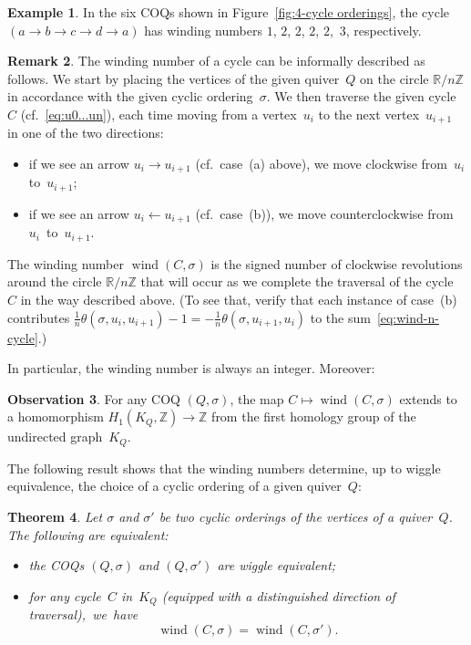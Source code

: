\documentclass[11pt, letterpaper]{amsart}
\newtheorem{theorem}{Theorem}[section]
\theoremstyle{definition}
\newtheorem{remark}[theorem]{Remark}
\newtheorem{example}[theorem]{Example}
\newtheorem{observation}[theorem]{Observation}
\numberwithin{equation}{section}
\def\ZZ{{\mathbb Z}}
\def\RR{{\mathbb R}}
\def\wind{{\operatorname{wind}}}
\newcommand\GQ{K_Q}
\begin{document}
\pagebreak[3]

\begin{example}
In the six COQs shown in Figure~\ref{fig:4-cycle orderings}, 
the cycle $(a\rightarrow b\rightarrow c\rightarrow d\rightarrow a)$
has winding numbers $1$, $2$, $2$, $2$, $2$,~$3$, respectively. 
\end{example}

\begin{remark}
The winding number of a cycle can be informally described as follows. 
We start by placing the vertices of the given quiver~$Q$ on the circle $\RR/n\ZZ$ 
in accordance with the given cyclic ordering~$\sigma$. 
We then traverse the given cycle~$C$ (cf.~\eqref{eq:u0...un}), each time moving from 
a vertex~$u_i$ to the next vertex~$u_{i+1}$ in one of the two directions:
\begin{itemize}[leftmargin=.2in]
\item 
if we see an arrow $u_i \rightarrow u_{i+1}$ (cf.\ case~(a) above), 
we move clockwise from~$u_i$ to~$u_{i+1}$;
\item
if we see an arrow $u_i \leftarrow u_{i+1}$ (cf.\ case~(b)), 
we move counterclockwise from~$u_i$~to~$u_{i+1}$. 
\end{itemize}
The winding number $\wind(C,\sigma)$ is the signed number of clockwise revolutions around  
the circle $\RR/n\ZZ$ that will occur as we complete the traversal of the cycle~$C$ in the way described above. 
(To see that, verify that each instance of case~(b) contributes $ \frac{1}{n}\theta(\sigma, u_i , u_{i+1}) - 1=-\frac{1}{n}\theta(\sigma, u_{i+1}, u_i) $ to the sum~\eqref{eq:wind-n-cycle}.) 
\end{remark}

In particular, the winding number is always an integer.
Moreover:

\begin{observation}
\label{ob:H1-to-Z}
For any COQ $(Q,\sigma)$, the map $C\mapsto \wind(C,\sigma)$ extends to a homomorphism
$H_1(\GQ,\ZZ)\to\ZZ$ from the first homology group of the undirected graph~$\GQ$. 
\end{observation}

The following result shows that the winding numbers determine, up to wiggle equivalence,
the choice of a cyclic ordering of a given quiver~$Q$: 

\begin{theorem}
\label{th:wiggle/winding}
Let $\sigma$ and $\sigma'$ be two cyclic orderings of the vertices of a quiver~$Q$. 
The following are equivalent:
\begin{itemize}[leftmargin=.2in]
\item 
the COQs $(Q,\sigma)$ and $(Q,\sigma')$ are wiggle equivalent; 
\item
for any cycle~$C$ in~$\GQ$ (equipped with a distinguished direction of traversal),~we~have 
\begin{equation*}
\wind(C,\sigma)=\wind(C,\sigma'). 
\end{equation*}
\end{itemize}
\end{theorem}
\end{document}
